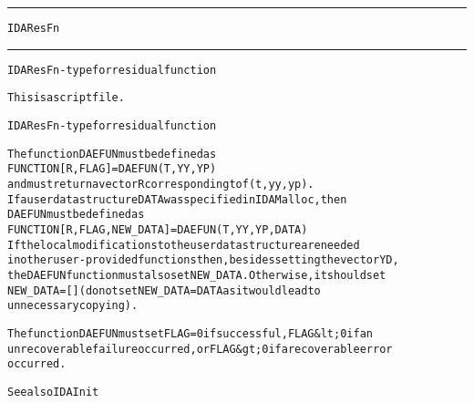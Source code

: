 \begin{samepage}
\hrule
\begin{center}
{\large \verb!IDAResFn!}
\label{p:IDAResFn}
\end{center}
\hrule\vspace{0.1in}



\begin{alltt}
IDAResFn - type for residual function
\end{alltt}

\end{samepage}



\begin{samepage}


\begin{alltt}
This is a script file. 
\end{alltt}

\end{samepage}



\begin{alltt}
IDAResFn - type for residual function

   The function DAEFUN must be defined as 
        FUNCTION [R, FLAG] = DAEFUN(T, YY, YP)
   and must return a vector R corresponding to f(t,yy,yp).
   If a user data structure DATA was specified in IDAMalloc, then
   DAEFUN must be defined as
        FUNCTION [R, FLAG, NEW_DATA] = DAEFUN(T, YY, YP, DATA)
   If the local modifications to the user data structure are needed 
   in other user-provided functions then, besides setting the vector YD,
   the DAEFUN function must also set NEW_DATA. Otherwise, it should set
   NEW_DATA=[] (do not set NEW_DATA = DATA as it would lead to
   unnecessary copying).

   The function DAEFUN must set FLAG=0 if successful, FLAG&lt;0 if an
   unrecoverable failure occurred, or FLAG&gt;0 if a recoverable error
   occurred.

   See also IDAInit
\end{alltt}






\vspace{0.1in}